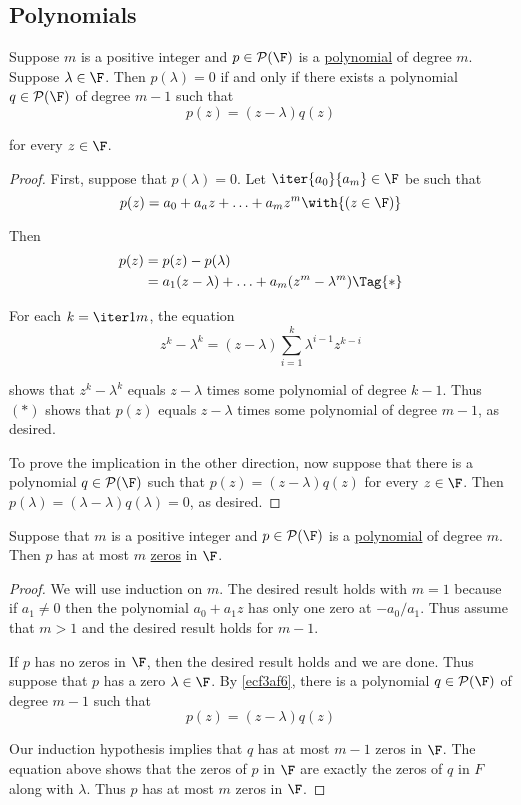 \subsection{Polynomials}\label{de73d11}

\label{ecf3af6}

Suppose $m$ is a positive integer and $p\in\mathcal P(\F)$ is a
\href{df84c07}{polynomial} of degree $m$. Suppose $\lambda\in\F$. Then
$p(\lambda)=0$ if and only if there exists a polynomial $q\in\mathcal P(\F)$ of
degree $m-1$ such that
$$
  p(z)=(z-\lambda)q(z)
$$

for every $z\in\F$.

\begin{proof}
  First, suppose that $p(\lambda)=0$. Let $\iter{a_0}{a_m}\in\F$ be such that
  $$
    p(z)=a_0+a_az+\ldots+a_mz^m\with{(z\in\F)}
  $$

  Then
  \begin{align*}
    p(z) &=p(z)-p(\lambda)                                 \\
         &=a_1(z-\lambda)+\ldots+a_m(z^m-\lambda^m)\Tag{*}
  \end{align*}

  For each $k=\iter1m$, the equation
  $$
    z^k-\lambda^k=(z-\lambda)\sum_{i=1}^k\lambda^{i-1}z^{k-i}
  $$

  shows that $z^k-\lambda^k$ equals $z-\lambda$ times some polynomial of degree
  $k-1$. Thus $(*)$ shows that $p(z)$ equals $z-\lambda$ times some polynomial
  of degree $m-1$, as desired.

  To prove the implication in the other direction, now suppose that there is a
  polynomial $q\in\mathcal P(\F)$ such that $p(z)=(z-\lambda)q(z)$ for every
  $z\in\F$. Then $p(\lambda)=(\lambda-\lambda)q(\lambda)=0$, as desired.
\end{proof}

\label{e6cd8e6}

Suppose that $m$ is a positive integer and $p\in\mathcal P(\F)$ is a
\href{df84c07}{polynomial} of degree $m$. Then $p$ has at most $m$
\href{addeddc}{zeros} in $\F$.

\begin{proof}
  We will use induction on $m$. The desired result holds with $m=1$ because if
  $a_1\neq0$ then the polynomial $a_0+a_1z$ has only one zero at $-a_0/a_1$.
  Thus assume that $m>1$ and the desired result holds for $m-1$.

  If $p$ has no zeros in $\F$, then the desired result holds and we are done.
  Thus suppose that $p$ has a zero $\lambda\in\F$. By \autoref{ecf3af6}, there
  is a polynomial $q\in\mathcal P(\F)$ of degree $m-1$ such that
  $$
    p(z)=(z-\lambda)q(z)
  $$

  Our induction hypothesis implies that $q$ has at most $m-1$ zeros in $\F$.
  The equation above shows that the zeros of $p$ in $\F$ are exactly the zeros
  of $q$ in $F$ along with $\lambda$. Thus $p$ has at most $m$ zeros in $\F$.
\end{proof}
